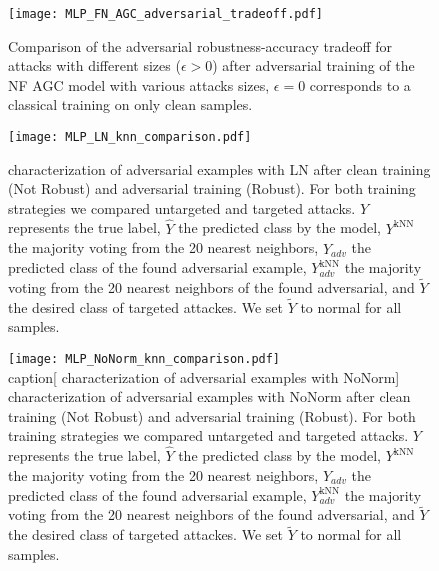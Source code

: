 \begin{figure}[htbp]
	\centering
	\texttt{[image: MLP\_FN\_AGC\_adversarial\_tradeoff.pdf]}
	\caption[ NF AGC adversarial robustness-accuracy tradeoff]{Comparison of the adversarial robustness-accuracy tradeoff for  attacks with different sizes (\(\epsilon > 0\)) after adversarial training of the  NF AGC model with various  attacks sizes, \(\epsilon = 0\) corresponds to a classical training on only clean samples. }\label{fig:mlp_fnagcadv_tradeoff}
\end{figure}


\begin{figure}[htbp]
	\centering
	\texttt{[image: MLP\_LN\_knn\_comparison.pdf]}
	\caption[ characterization of adversarial examples with  LN]{ characterization of adversarial examples with  LN after clean training (Not Robust) and adversarial training (Robust). For both training strategies we compared untargeted and targeted attacks. \(Y\) represents the true label, \(\hat{Y}\) the predicted class by the model, \(Y^{\text{kNN}}\) the majority voting from the 20 nearest neighbors, \(\hat{Y}_{adv}\) the predicted class of the found adversarial example, \(Y^{\text{kNN}}_{adv}\) the majority voting from the 20 nearest neighbors of the found adversarial, and \(\tilde{Y}\) the desired class of targeted attackes. We set \(\tilde{Y}\) to normal for all samples.}\label{fig:mlp_ln_knn_comp}
\end{figure}

\begin{figure}[htbp]
	\centering
	\texttt{[image: MLP\_NoNorm\_knn\_comparison.pdf]}
	\\caption[ characterization of adversarial examples with  NoNorm]{ characterization of adversarial examples with  NoNorm after clean training (Not Robust) and adversarial training (Robust). For both training strategies we compared untargeted and targeted attacks. \(Y\) represents the true label, \(\hat{Y}\) the predicted class by the model, \(Y^{\text{kNN}}\) the majority voting from the 20 nearest neighbors, \(\hat{Y}_{adv}\) the predicted class of the found adversarial example, \(Y^{\text{kNN}}_{adv}\) the majority voting from the 20 nearest neighbors of the found adversarial, and \(\tilde{Y}\) the desired class of targeted attackes. We set \(\tilde{Y}\) to normal for all samples.}\label{fig:mlp_nonorm_knn_comp}
\end{figure}

